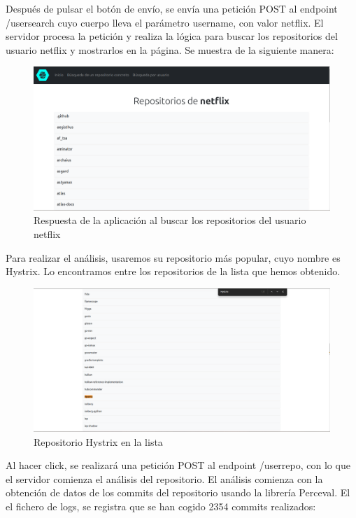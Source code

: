 \documentclass[a4paper, 12pt]{book}
\begin{document}
Después de pulsar el botón de envío, se envía una petición POST al endpoint /usersearch cuyo cuerpo lleva el parámetro username, con valor netflix. El servidor procesa la petición y realiza la lógica para buscar los repositorios del usuario netflix y mostrarlos en la página. Se muestra de la siguiente manera:

\begin{figure}[H]
  \centering
  \includegraphics[width=1\textwidth]{img/listanetflix.png}
  \caption{Respuesta de la aplicación al buscar los repositorios del usuario netflix}
  \label{figura:netflixresp}
\end{figure}

Para realizar el análisis, usaremos su repositorio más popular, cuyo nombre es Hystrix. Lo encontramos entre los repositorios de la lista que hemos obtenido.


\begin{figure}[H]
  \centering
  \includegraphics[width=1\textwidth]{img/hystrixenlista.png}
  \caption{Repositorio Hystrix en la lista}
  \label{figura:hystrixlist}
\end{figure}

Al hacer click, se realizará una petición POST al endpoint /userrepo, con lo que el servidor comienza el análisis del repositorio. El análisis comienza con la obtención de datos de los commits del repositorio usando la librería Perceval. El el fichero de logs, se registra que se han cogido 2354 commits realizados:
\end{document}
